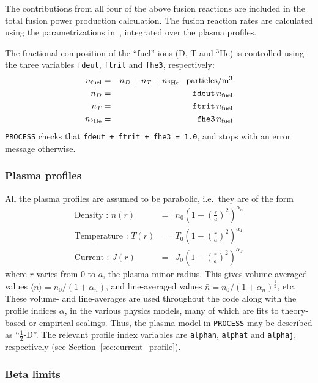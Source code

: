 \documentclass[11pt,a4paper]{report}
\newcommand{\process}{\mbox{\texttt{PROCESS}}}
\begin{document}
The contributions from all four of the above fusion reactions are included in
the total fusion power production calculation. The fusion reaction rates are
calculated using the parametrizations in~\cite{BoschHale}, integrated over the plasma
profiles.

The fractional composition of the ``fuel'' ions (D, T and $^3$He) is
controlled using the three variables \texttt{fdeut}, \texttt{ftrit} and
\texttt{fhe3}, respectively:
\begin{eqnarray*}
n_{\mbox{\scriptsize fuel}} & = & n_D + n_T + n_{\mathrm{^{3}He}}  \;\;\; \mbox{particles/m$^3$} \\
n_D & = & \mathtt{fdeut} \, n_{\mbox{\scriptsize fuel}} \\
n_T & = & \mathtt{ftrit} \, n_{\mbox{\scriptsize fuel}} \\
n_{\mathrm{^{3}He}} & = & \mathtt{fhe3} \, n_{\mbox{\scriptsize fuel}}
\end{eqnarray*}
\process\/ checks that \texttt{fdeut + ftrit + fhe3 = 1.0}, and stops with an
error message otherwise.

\subsubsection{Plasma profiles}

All the plasma profiles are assumed to be parabolic, i.e.\ they are of the
form
\begin{eqnarray}
\mbox{Density : } n(r) & = & n_0 \left( 1- \left(\frac{r}{a}\right)^2 \right)
^{\alpha_n} \\
\mbox{Temperature : } T(r) & = & T_0 \left( 1- \left(\frac{r}{a}\right)^2
\right) ^{\alpha_T} \\
\mbox{Current : } J(r) & = & J_0 \left( 1- \left(\frac{r}{a}\right)^2  \right)
^{\alpha_J}
\end{eqnarray}
where $r$ varies from 0 to $a$, the plasma minor radius. This gives
volume-averaged values $\langle n \rangle = n_0 / (1+\alpha_n)$, and
line-averaged values $\bar{n} = n_0 / (1+\alpha_n)^{\frac{1}{2}}$, etc.  These
volume- and line-averages are used throughout the code along with the profile
indices $\alpha$, in the various physics models, many of which are fits to
theory-based or empirical scalings. Thus, the plasma model in \process\/ may
be described as ``$\frac{1}{2}$-D''.  The relevant profile index variables are
\texttt{alphan}, \texttt{alphat} and \texttt{alphaj}, respectively (see
Section~\ref{sec:current_profile}).

\subsubsection{Beta limits}
\end{document}
